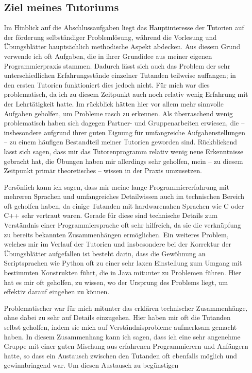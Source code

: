 \documentclass[%
fontsize=12pt,
paper=a4,
oneside,
DIV=13,
BCOR=0cm,
pagesize=automedia,
parskip=false,
headings=normal,
titlepage=true%
]{scrartcl}
\begin{document}
\subsection{Ziel meines Tutoriums}
Im Hinblick auf die Abschlussaufgaben liegt das Hauptinteresse der Tutorien auf
der f\"orderung selbst\"andiger
Probleml\"osung, w\"ahrend die Vorlesung und \"Ubungsbl\"atter
haupts\"achlich methodische Aspekt abdecken.
Aus diesem Grund verwende ich oft Aufgaben, die in ihrer Grundidee aus meiner
eigenen Programmierpraxis stammen.
Dadurch l\"asst sich auch das Problem der sehr unterschiedlichen
Erfahrungsst\"ande einzelner Tutanden teilweise
auffangen; in den ersten Tutorien funktioniert dies jedoch nicht. F\"ur mich
war dies problematisch, da ich zu diesem
Zeitpunkt auch noch relativ wenig Erfahrung mit der Lehrt\"atigkeit hatte. Im
r\"uckblick h\"atten hier vor allem mehr sinnvolle
Aufgaben geholfen, um Probleme rasch zu erkennen. Als \"uberraschend wenig
problematisch haben sich dagegen Partner- und
Gruppenarbeiten erwiesen, die -- insbesondere aufgrund ihrer guten Eignung
f\"ur umfangreiche Aufgabenstellungen -- zu
einem h\"aufigen Bestandteil meiner Tutorien geworden sind. R\"uckblickend
l\"asst sich sagen, dass mir das Tutorenprogramm relativ
wenig neue Erkenntnisse gebracht hat, die \"Ubungen haben mir allerdings sehr
geholfen, mein -- zu diesem Zeitpunkt prim\"ar theoretisches
-- wissen in der Praxis umzusetzen.

Pers\"onlich kann ich sagen, dass mir meine lange Programmiererfahrung mit
mehreren Sprachen
und umfangreiches Detailwissen auch im technischen Bereich oft
geholfen haben, da einige Tutanden mit hardwarenahen Sprachen wie C oder C++
sehr vertraut waren. Gerade f\"ur diese sind technische Details
zum Verst\"andnis einer Programmiersprache oft sehr hilfreich, da sie die
verkn\"upfung zu bereits bekannten Zusammenh\"angen
erm\"oglichen. Ein weiteres Problem, welches mir im Verlauf der Tutorien und
insbesondere bei der Korrektur der \"Ubungsbl\"atter
aufgefallen ist besteht darin, dass die Gew\"ohnung an Scriptsprachen wie
Python oft zu einer sehr laxen Einstellung zum Umgang
mit bestimmten Konstrukten f\"uhrt, die in Java mitunter zu Problemen
f\"uhren. Hier hat es mir oft geholfen, zu wissen,
wo der Ursprung des Problems liegt, um effektiv darauf eingehen zu k\"onnen.

Problematischer war f\"ur mich mitunter das erkl\"aren technischer
Zusammenh\"ange, ohne dabei zu sehr auf Details einzugehen.
Hier haben mir oft die Tutanden selbst geholfen, indem sie mich auf
Verst\"andnisprobleme aufmerksam gemacht haben.
In diesem Zusammenhang kann ich sagen, dass ich eine sehr angenehme Gruppe mit
einer guten Mischung aus erfahrenen Programmierern und
Anf\"angern hatte, so dass ein Austausch zwischen den Tutanden oft ebenfalls
m\"oglich und gewinnbringend war. Um diesen Austausch zu beg\"unstigen
\end{document}
